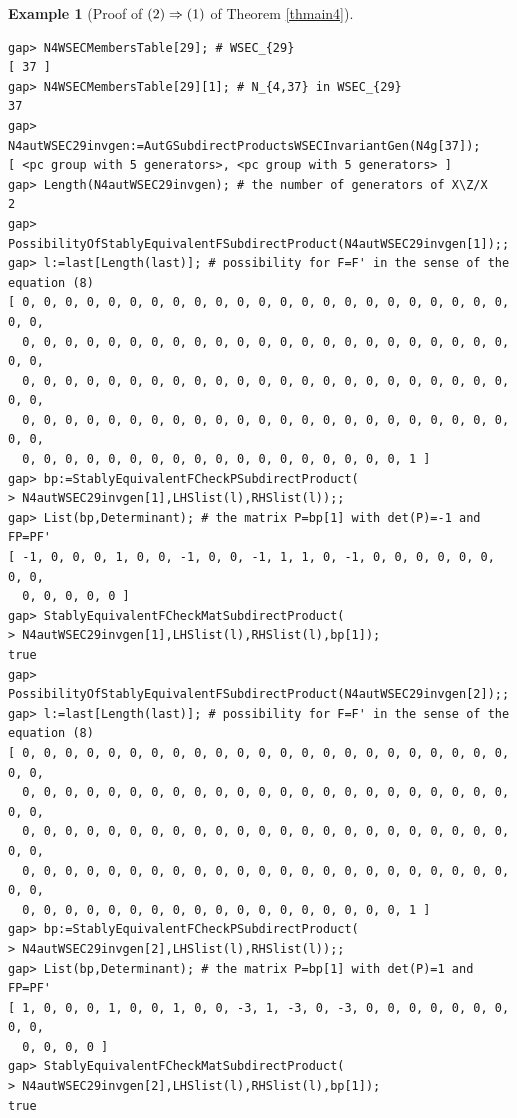 \documentclass{amsart}
\theoremstyle{plain}
\theoremstyle{definition}
\newtheorem{example}[theorem]{Example}
\theoremstyle{remark}
\begin{document}
\begin{example}[Proof of ${\rm (2)}\Rightarrow {\rm (1)}$ of {Theorem \ref{thmain4}}]
\begin{verbatim}
gap> N4WSECMembersTable[29]; # WSEC_{29}
[ 37 ]
gap> N4WSECMembersTable[29][1]; # N_{4,37} in WSEC_{29}
37
gap> N4autWSEC29invgen:=AutGSubdirectProductsWSECInvariantGen(N4g[37]);
[ <pc group with 5 generators>, <pc group with 5 generators> ]
gap> Length(N4autWSEC29invgen); # the number of generators of X\Z/X
2
gap> PossibilityOfStablyEquivalentFSubdirectProduct(N4autWSEC29invgen[1]);;
gap> l:=last[Length(last)]; # possibility for F=F' in the sense of the equation (8)
[ 0, 0, 0, 0, 0, 0, 0, 0, 0, 0, 0, 0, 0, 0, 0, 0, 0, 0, 0, 0, 0, 0, 0, 0, 0, 
  0, 0, 0, 0, 0, 0, 0, 0, 0, 0, 0, 0, 0, 0, 0, 0, 0, 0, 0, 0, 0, 0, 0, 0, 0, 
  0, 0, 0, 0, 0, 0, 0, 0, 0, 0, 0, 0, 0, 0, 0, 0, 0, 0, 0, 0, 0, 0, 0, 0, 0, 
  0, 0, 0, 0, 0, 0, 0, 0, 0, 0, 0, 0, 0, 0, 0, 0, 0, 0, 0, 0, 0, 0, 0, 0, 0, 
  0, 0, 0, 0, 0, 0, 0, 0, 0, 0, 0, 0, 0, 0, 0, 0, 0, 0, 1 ]
gap> bp:=StablyEquivalentFCheckPSubdirectProduct(
> N4autWSEC29invgen[1],LHSlist(l),RHSlist(l));;
gap> List(bp,Determinant); # the matrix P=bp[1] with det(P)=-1 and FP=PF'
[ -1, 0, 0, 0, 1, 0, 0, -1, 0, 0, -1, 1, 1, 0, -1, 0, 0, 0, 0, 0, 0, 0, 0, 
  0, 0, 0, 0, 0 ]
gap> StablyEquivalentFCheckMatSubdirectProduct(
> N4autWSEC29invgen[1],LHSlist(l),RHSlist(l),bp[1]);
true
gap> PossibilityOfStablyEquivalentFSubdirectProduct(N4autWSEC29invgen[2]);;
gap> l:=last[Length(last)]; # possibility for F=F' in the sense of the equation (8)
[ 0, 0, 0, 0, 0, 0, 0, 0, 0, 0, 0, 0, 0, 0, 0, 0, 0, 0, 0, 0, 0, 0, 0, 0, 0, 
  0, 0, 0, 0, 0, 0, 0, 0, 0, 0, 0, 0, 0, 0, 0, 0, 0, 0, 0, 0, 0, 0, 0, 0, 0, 
  0, 0, 0, 0, 0, 0, 0, 0, 0, 0, 0, 0, 0, 0, 0, 0, 0, 0, 0, 0, 0, 0, 0, 0, 0, 
  0, 0, 0, 0, 0, 0, 0, 0, 0, 0, 0, 0, 0, 0, 0, 0, 0, 0, 0, 0, 0, 0, 0, 0, 0, 
  0, 0, 0, 0, 0, 0, 0, 0, 0, 0, 0, 0, 0, 0, 0, 0, 0, 0, 1 ]
gap> bp:=StablyEquivalentFCheckPSubdirectProduct(
> N4autWSEC29invgen[2],LHSlist(l),RHSlist(l));;
gap> List(bp,Determinant); # the matrix P=bp[1] with det(P)=1 and FP=PF'
[ 1, 0, 0, 0, 1, 0, 0, 1, 0, 0, -3, 1, -3, 0, -3, 0, 0, 0, 0, 0, 0, 0, 0, 0, 
  0, 0, 0, 0 ]
gap> StablyEquivalentFCheckMatSubdirectProduct(
> N4autWSEC29invgen[2],LHSlist(l),RHSlist(l),bp[1]);
true


\end{verbatim}
\end{example}
\end{document}
